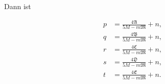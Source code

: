 Dann ist

\[
\begin{aligned}
p &= \frac{4\mathfrak{A}}{5M-m\mathfrak{M}} + n,\\[3pt]
q &= \frac{4\mathfrak{B}}{5M-m\mathfrak{M}} + n,\\[3pt]
r &= \frac{4\mathfrak{C}}{5M-m\mathfrak{M}} + n,\\[3pt]
s &= \frac{4\mathfrak{D}}{5M-m\mathfrak{M}} + n,\\[3pt]
t &= \frac{4\mathfrak{E}}{5M-m\mathfrak{M}} + n.
\end{aligned}
\]

